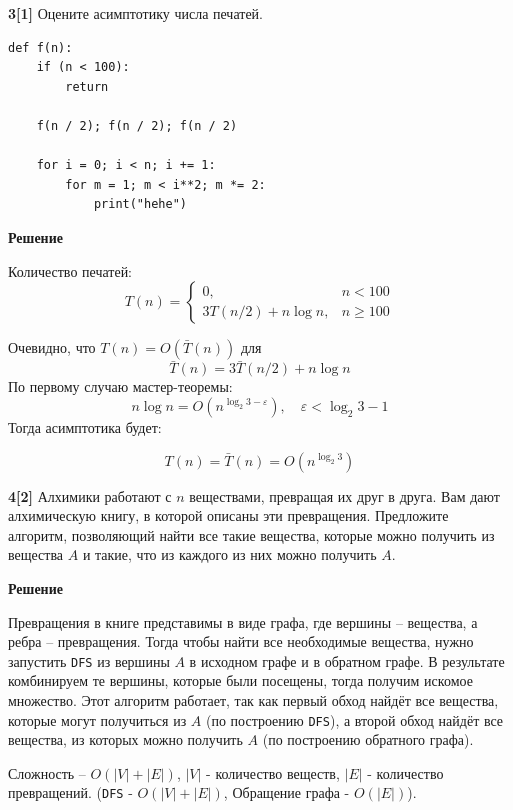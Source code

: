 \documentclass{article}
\begin{document}
\medskip

\textbf{3[1]} Оцените асимптотику числа печатей.

\begin{lstlisting}
def f(n):
    if (n < 100):
        return
    
    f(n / 2); f(n / 2); f(n / 2)

    for i = 0; i < n; i += 1:
        for m = 1; m < i**2; m *= 2:
            print("hehe")
\end{lstlisting}

\medskip

\textbf{Решение}

\medskip

Количество печатей:
\[
	T(n) = \begin{cases}
		0,                    & n < 100    \\
		3T(n / 2) + n \log n, & n \geq 100
	\end{cases}
\]

Очевидно, что $T(n) = O(\bar{T}(n))$ для
\[
	\bar{T}(n) = 3\bar{T}(n / 2) + n \log n
\]
По первому случаю мастер-теоремы:
\[
	n \log n = O(n^{\log_2 3 - \varepsilon}), \quad \varepsilon < \log_2 3 - 1
\]
Тогда асимптотика будет:

\[
	T(n) = \bar{T}(n) = O(n^{\log_2 3})
\]

\medskip

\textbf{4[2]} Алхимики работают с $n$ веществами, превращая их друг в друга. Вам дают алхимическую книгу, в которой описаны эти превращения. Предложите алгоритм, позволяющий найти все такие вещества, которые можно получить из вещества $A$ и такие, что из каждого из них можно получить $A$.

\medskip

\textbf{Решение}

\medskip
Превращения в книге представимы в виде графа, где вершины -- вещества,
а ребра -- превращения. Тогда чтобы найти все необходимые вещества,
нужно запустить \texttt{DFS} из вершины $A$ в исходном графе и
в обратном графе. В результате комбинируем те вершины, которые были посещены,
тогда получим искомое множество. Этот алгоритм работает, так как
первый обход найдёт все вещества, которые могут получиться из $A$
(по построению \texttt{DFS}),
а второй обход найдёт все вещества, из которых можно получить $A$
(по построению обратного графа).

Сложность -- $O(|V| + |E|)$, $|V|$ - количество веществ, $|E|$ - количество превращений.
(\texttt{DFS} - $O(|V| + |E|)$, Обращение графа - $O(|E|)$).
\end{document}

